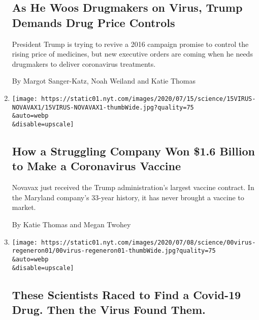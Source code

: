\begin{enumerate}
  \hypertarget{as-he-woos-drugmakers-on-virus-trump-demands-drug-price-controls}{%
  \subsection{As He Woos Drugmakers on Virus, Trump Demands Drug Price
  Controls}\label{as-he-woos-drugmakers-on-virus-trump-demands-drug-price-controls}}

  President Trump is trying to revive a 2016 campaign promise to control
  the rising price of medicines, but new executive orders are coming
  when he needs drugmakers to deliver coronavirus treatments.

  By Margot Sanger-Katz, Noah Weiland and Katie Thomas
\item
  \href{/2020/07/16/health/coronavirus-vaccine-novavax.html}{}

  \texttt{[image: https://static01.nyt.com/images/2020/07/15/science/15VIRUS-NOVAVAX1/15VIRUS-NOVAVAX1-thumbWide.jpg?quality=75\\\&auto=webp\\\&disable=upscale]}

  \hypertarget{how-a-struggling-company-won-16-billion-to-make-a-coronavirus-vaccine}{%
  \subsection{How a Struggling Company Won \$1.6 Billion to Make a
  Coronavirus
  Vaccine}\label{how-a-struggling-company-won-16-billion-to-make-a-coronavirus-vaccine}}

  Novavax just received the Trump administration's largest vaccine
  contract. In the Maryland company's 33-year history, it has never
  brought a vaccine to market.

  By Katie Thomas and Megan Twohey
\item
  \href{/2020/07/09/health/regeneron-monoclonal-antibodies.html}{}

  \texttt{[image: https://static01.nyt.com/images/2020/07/08/science/00virus-regeneron01/00virus-regeneron01-thumbWide.jpg?quality=75\\\&auto=webp\\\&disable=upscale]}

  \hypertarget{these-scientists-raced-to-find-a-covid-19-drug-then-the-virus-found-them}{%
  \subsection{These Scientists Raced to Find a Covid-19 Drug. Then the
  Virus Found
  Them.}\label{these-scientists-raced-to-find-a-covid-19-drug-then-the-virus-found-them}}


\end{enumerate}
